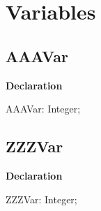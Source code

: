 \documentclass{report}
\newif\ifpdf
\begin{document}
\section{Variables}
\ifpdf
\subsection*{\large{\textbf{AAAVar}}\normalsize\hspace{1ex}\hrulefill}
\else
\subsection*{AAAVar}
\fi
\label{ok_sorting-AAAVar}
\begin{list}{}{
\setlength{\itemindent}{0cm}
\setlength{\listparindent}{0cm}
\setlength{\leftmargin}{\evensidemargin}
\addtolength{\leftmargin}{\tmplength}
\settowidth{\labelsep}{X}
\addtolength{\leftmargin}{\labelsep}
\setlength{\labelwidth}{\tmplength}
}
\item[\textbf{Declaration}\hfill]
\ifpdf
\begin{flushleft}
\fi
\begin{ttfamily}
AAAVar: Integer;\end{ttfamily}

\ifpdf
\end{flushleft}
\fi

\end{list}
\ifpdf
\subsection*{\large{\textbf{ZZZVar}}\normalsize\hspace{1ex}\hrulefill}
\else
\subsection*{ZZZVar}
\fi
\label{ok_sorting-ZZZVar}
\begin{list}{}{
\setlength{\itemindent}{0cm}
\setlength{\listparindent}{0cm}
\setlength{\leftmargin}{\evensidemargin}
\addtolength{\leftmargin}{\tmplength}
\settowidth{\labelsep}{X}
\addtolength{\leftmargin}{\labelsep}
\setlength{\labelwidth}{\tmplength}
}
\item[\textbf{Declaration}\hfill]
\ifpdf
\begin{flushleft}
\fi
\begin{ttfamily}
ZZZVar: Integer;\end{ttfamily}

\ifpdf
\end{flushleft}
\fi

\end{list}
\end{document}
